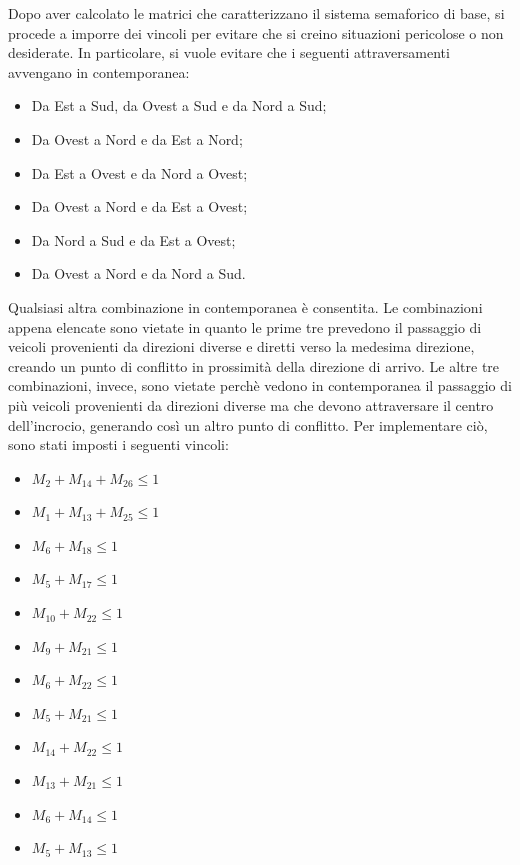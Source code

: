 Dopo aver calcolato le matrici che caratterizzano il sistema semaforico di base, si procede a imporre dei vincoli per evitare che si creino situazioni pericolose o non desiderate. In particolare, si vuole evitare che i seguenti attraversamenti avvengano in contemporanea:

\begin{itemize}
    \item Da Est a Sud, da Ovest a Sud e da Nord a Sud;
    \item Da Ovest a Nord e da Est a Nord;
    \item Da Est a Ovest e da Nord a Ovest;
    \item Da Ovest a Nord e da Est a Ovest;
    \item Da Nord a Sud e da Est a Ovest;
    \item Da Ovest a Nord e da Nord a Sud.
    
\end{itemize}

Qualsiasi altra combinazione in contemporanea è consentita. Le combinazioni appena elencate sono vietate in quanto le prime tre prevedono il passaggio di veicoli provenienti da direzioni diverse e diretti verso la medesima direzione, creando un punto di conflitto in prossimità della direzione di arrivo. Le altre tre combinazioni, invece, sono vietate perchè vedono in contemporanea il passaggio di più veicoli provenienti da direzioni diverse ma che devono attraversare il centro dell'incrocio, generando così un altro punto di conflitto. Per implementare ciò, sono stati imposti i seguenti vincoli:

\begin{itemize}
    \item $M_{2} + M_{14} + M_{26} \leq 1$
    \item $M_{1} + M_{13} + M_{25} \leq 1$
    \item $M_{6} + M_{18} \leq 1$
    \item $M_{5} + M_{17} \leq 1$
    \item $M_{10} + M_{22} \leq 1$
    \item $M_{9} + M_{21} \leq 1$
    \item $M_{6} + M_{22} \leq 1$
    \item $M_{5} + M_{21} \leq 1$
    \item $M_{14} + M_{22} \leq 1$
    \item $M_{13} + M_{21} \leq 1$
    \item $M_{6} + M_{14} \leq 1$
    \item $M_{5} + M_{13} \leq 1$
\end{itemize}

